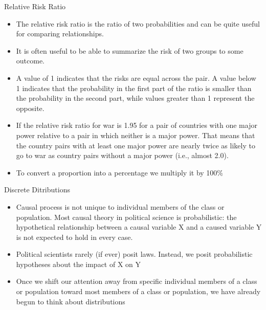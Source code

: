 \documentclass[
  ignorenonframetext,
]{beamer}
\begin{document}
\begin{frame}{Relative Risk Ratio}
\protect\hypertarget{relative-risk-ratio}{}

\begin{itemize}
\item
  The relative risk ratio is the ratio of two probabilities and can be
  quite useful for comparing relationships.
\item
  It is often useful to be able to summarize the risk of two groups to
  some outcome.
\item
  A value of 1 indicates that the risks are equal across the pair. A
  value below 1 indicates that the probability in the first part of the
  ratio is smaller than the probability in the second part, while values
  greater than 1 represent the opposite.
\item
  If the relative risk ratio for war is 1.95 for a pair of countries
  with one major power relative to a pair in which neither is a major
  power. That means that the country pairs with at least one major power
  are nearly twice as likely to go to war as country pairs without a
  major power (i.e., almost 2.0).
\item
  To convert a proportion into a percentage we multiply it by 100\%
\end{itemize}

\end{frame}

\begin{frame}{Discrete Ditributions}
\protect\hypertarget{discrete-ditributions}{}

\begin{itemize}
\item
  Causal process is not unique to individual members of the class or
  population. Most causal theory in political science is probabilistic:
  the hypothetical relationship between a causal variable X and a caused
  variable Y is not expected to hold in every case.
\item
  Political scientists rarely (if ever) posit laws. Instead, we posit
  probabilistic hypotheses about the impact of X on Y
\item
  Once we shift our attention away from specific individual members of a
  class or population toward most members of a class or population, we
  have already begun to think about distributions
\end{itemize}

\end{frame}
\end{document}
